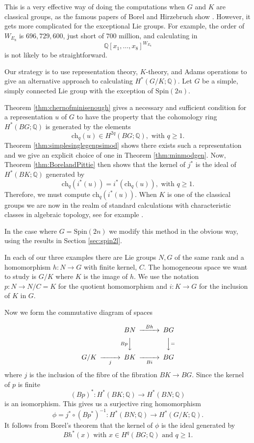 \documentclass[twoside,a4paper,reqno,11pt]{amsart}
\newcommand{\Q}{\mathbb{Q}}
\newcommand{\Spin}{\mathrm{Spin}}
\newcommand{\ch}{\mathrm{ch}}
\begin{document}
This is a very effective way of doing the computations when $G$ and $K$ are classical groups, as the famous papers of Borel and Hirzebruch show \cite{MR0102800,MR0110105,MR0120664}. However, it gets more complicated for the exceptional Lie groups. For example, the order of $W_{E_8}$ is $696,729, 600$, just short of $700$ million, and calculating in 
$$
\Q[x_1, \ldots, x_8]^{W_{E_8}}
$$
is not likely to be straightforward. 

Our strategy is to use representation theory, $K$-theory, and Adams operations to give an alternative approach to calculating $H^*(G/K; \Q)$. Let $G$ be a simple, simply connected Lie group with the exception of $\Spin(2n)$. 

Theorem \ref{thm:chernofminisenough} gives a necessary and sufficient condition for a representation $u$ of $G$ to have the property that the cohomology ring $H^*(BG; \Q)$ is generated by the elements  
$$
\ch_q(u) \in H^{2q}(BG; \Q),  \text{ with } q \geq 1.
$$
Theorem \ref{thm:simplesinglegenpsimod} shows there exists such a representation and we give an explicit choice of one in Theorem \ref{thm:minmodgen}. Now, Theorem \ref{thm:BorelandPittie} then shows that the kernel of $j^*$ is the ideal of $H^*(BK; \Q)$ generated by
\[
\ch_q(i^*(u)) = i^*(\ch_q(u)),  \text{ with } q \geq 1. 
\]
Therefore, we must compute $\ch_q(i^*(u))$. When $K$ is one of the classical groups we are now in the realm of standard calculations with characteristic classes in algebraic topology, see for example \cite{MR1443417}. 

In the case where $G = \Spin(2n)$ we modify this method in the obvious way, using the results in Section \ref{sec:spin2l}. 

In each of our three examples there are Lie groups $N, G$ of the same rank and a homomorphism $h : N \to G$ with finite kernel, $C$.  The homogeneous space we want to study is $G/K$ where $K$ is the image of $h$. We use the notation $p : N \to N/C =K$ for the quotient homomorphism and $i: K \to G$ for the inclusion of $K$ in $G$. 

Now we form the commutative diagram of spaces

\[
\begin{CD}
@.BN @>Bh>> BG \\
@.@VBpVV @VV=V\\
G/K @>>j>BK @>>Bi> BG\\
\end{CD}
\]
where $j$ is the inclusion of the fibre of the fibration $BK \to BG$. Since the kernel of $p$ is finite 
$$
(Bp)^*: H^*(BK; \Q) \to H^*(BN; \Q)
$$
is an isomorphism.  This gives us a surjective ring homomorphism
$$
\phi = j^*\circ (Bp^*)^{-1}: H^*(BN; \Q) \to H^*(G/K; \Q).
$$
It follows from Borel's theorem that the kernel of $\phi$ is the ideal generated by
\[
Bh^*(x) \text{ with } x \in H^q(BG; \Q) \text{ and } q \geq 1.
\]
\end{document}
